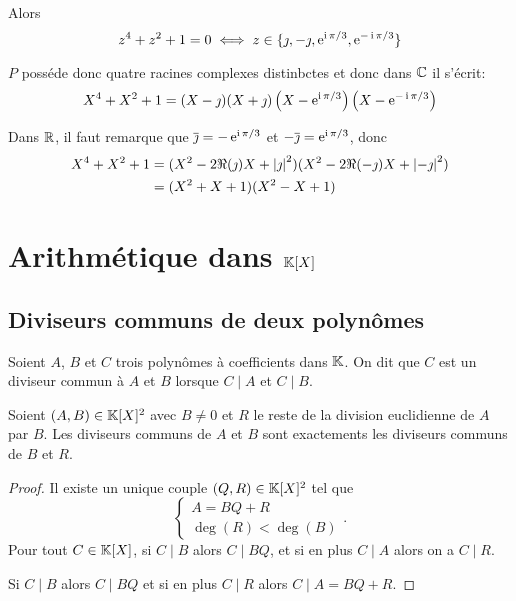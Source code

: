   Alors
  \begin{equation}
    z^4+z^2+1=0 \iff z \in \{\jmath, -\jmath, \operatorname{e}^{\operatorname{i}\pi/3}, \operatorname{e}^{-\operatorname{i}\pi/3}\}
  \end{equation}

  \(P\) posséde donc quatre racines complexes distinbctes et donc dans \(\mathbb{C}\) il s'écrit:
  \begin{equation}
    X^4+X^2+1 = (X-\jmath)(X+\jmath)\left(X-\operatorname{e}^{\operatorname{i}\pi/3}\right)\left(X-\operatorname{e}^{-\operatorname{i}\pi/3}\right)
  \end{equation}

  Dans \(\mathbb{R}\), il faut remarque que \(\overline{\jmath}=-\operatorname{e}^{\operatorname{i}\pi/3}\) et \(-\overline{\jmath}=\operatorname{e}^{\operatorname{i}\pi/3}\), donc
  \begin{align}
    X^4+X^2+1 &= (X^2-2\Re(\jmath)X+\left\lvert\jmath\right\rvert^2)(X^2-2\Re(-\jmath)X+\left\lvert-\jmath\right\rvert^2)\\
              &=(X^2+X+1)(X^2-X+1)
  \end{align}

  \section{Arithmétique dans \(\mathbb{K}[X]\)}

  \subsection{Diviseurs communs de deux polynômes}

  \begin{defdef}
    Soient \(A\), \(B\) et \(C\) trois polynômes à coefficients dans \(\mathbb{K}\). On dit que \(C\) est un diviseur commun à \(A\) et \(B\) lorsque \(C\mid{}A\) et \(C\mid{}B\).
  \end{defdef}

  \begin{prop}
    Soient \((A,B)\in\mathbb{K}[X]^2\) avec \(B \neq 0\) et \(R\) le reste de la division euclidienne de \(A\) par \(B\). Les diviseurs communs de \(A\) et \(B\) sont exactements les diviseurs communs de \(B\) et \(R\).
  \end{prop}
  \begin{proof}
    Il existe un unique couple \((Q,R) \in \mathbb{K}[X]^2\) tel que 
    \begin{equation}
      \begin{cases} 
        A=BQ+R \\ \deg(R) < \deg(B) 
      \end{cases}.
    \end{equation}
    Pour tout \(C \in \mathbb{K}[X]\), si  \(C\mid{}B\) alors \(C\mid{}BQ\), et si en plus \(C\mid{}A\) alors on a \(C\mid{}R\).

    Si \(C\mid{}B\) alors \(C\mid{}BQ\) et si en plus \(C\mid{}R\) alors \(C\mid{}A=BQ+R\).
  \end{proof}

